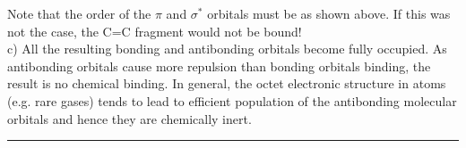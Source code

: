\noindent
Note that the order of the $\pi$ and $\sigma^*$ orbitals must be as shown
above. If this was not the case, the C=C fragment would not be bound!\\

\noindent
c) All the resulting bonding and antibonding orbitals become fully occupied. 
As antibonding orbitals cause more repulsion than bonding orbitals binding,
the result is no chemical binding. In general, the octet electronic
structure in atoms (e.g. rare gases) tends to lead to efficient population of the antibonding
molecular orbitals and hence they are chemically inert.\\

\hrule\vspace{0.5cm}
